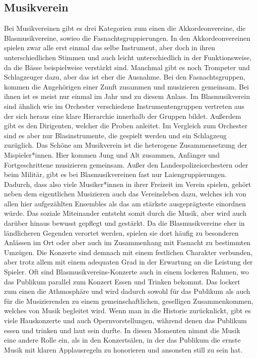 \subsection{Musikverein}
Bei Musikvereinen gibt es drei Kategorien zum einen die Akkordeonvereine, die
Blasmusikvereine, sowieo die Fasnachtsgruppierungen. In den Akkordeonvereinen spielen zwar alle
erst einmal das selbe Instrument, aber doch in ihren unterschiedlichen
Stimmen und auch leicht unterschiedlich in der Funktionsweise, da die Bässe
beispielweise verstärkt sind. Manchmal gibt es noch Trompeter und Schlagzeuger
dazu, aber das ist eher die Ausnahme. Bei den Fasnachtsgruppen, kommen die
Angehörigen einer Zunft zusammen und musizieren gemeinsam. Bei ihnen ist es
meist nur einmal im Jahr und zu diesem Anlass. 
Im Blasmusikverein sind ähnlich wie im Orchester verschiedene
Instrumentengruppen vertreten aus der sich heraus eine klare Hierarchie
innerhalb der Gruppen bildet. Außerdem gibt es den Dirigenten, welcher die
Proben anleitet. Im Vergleich zum Orchester sind es aber nur Blasinstrumente, die
gespielt werden und ein Schlagzeug zuzüglich. Das Schöne am Musikverein ist die
heterogene Zusammensetzung der Mispieler*innen. Hier kommen Jung und Alt
zusammen, Anfänger und Fortgeschrittene musizieren gemeinsam. Außer den Landespolizeiorchestern oder
beim Militär, gibt es bei
Blasmusikvereinen fast nur Laiengruppierungen. Dadurch, dass also viele Musiker*innen in ihrer Freizeit im Verein
spielen, gehört neben dem eigentlichen Musizieren auch das Vereinsleben dazu,
welches ich von allen hier aufgezählten Ensembles als das am stärkste ausgeprägteste einordnen
würde. Das soziale Miteinander entsteht somit durch die Musik, aber wird auch
darüber hinaus bewusst gepflegt und gestärkt. Da die Blasmusikvereine eher in ländlicheren Gegenden verortet werden,
spielen sie dort häufig zu besonderen Anlässen im Ort oder aber auch im Zusammenhang
mit Fasnacht zu bestimmten Umzügen. Die Konzerte sind demnach mit einem festlichen
Charakter verbunden, aber trotz allem mit einem adequaten Grad in der Erwartung
an die Leistung der Spieler. Oft sind Blasmusikvereins-Konzerte auch in einem
lockeren Rahmen, wo das Publikum parallel zum Konzert Essen und Trinken bekommt.
Das lockert zum einen die Athmosphäre und wird dadurch sowohl für das Publikum
als auch für die Musizierenden zu einem gemeinschaftlichen, geselligen
Zusammenkommen, welches von Musik begleitet wird. Wenn man in die Historie
zurücknlickt, gibt es viele Hauskonzerte und auch Opernvorstellungen, während
denen das Publikum essen und trinken und laut sein durfte. In diesen Momenten
nimmt die Musik eine andere Rolle ein, als in den Konzertsälen, in der das
Publikum die ernste Musik mit klaren Applausregeln zu honorieren und ansonsten
still zu sein hat. 


